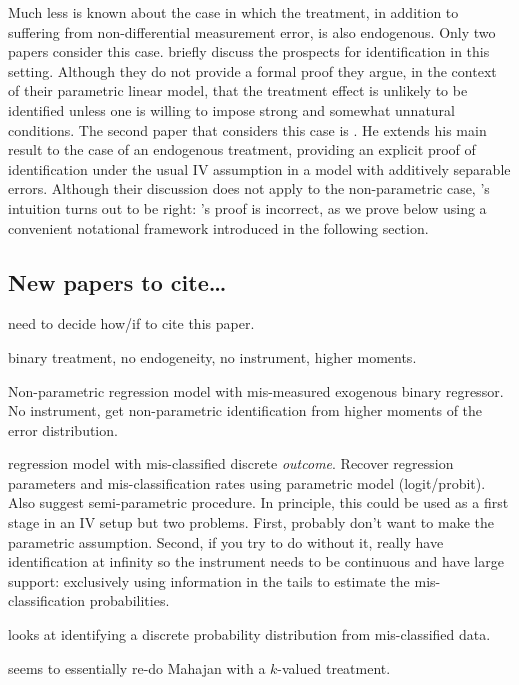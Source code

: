 Much less is known about the case in which the treatment, in addition to suffering from non-differential measurement error, is also endogenous.
Only two papers consider this case.
\cite{FL} briefly discuss the prospects for identification in this setting.
Although they do not provide a formal proof they argue, in the context of their parametric linear model, that the treatment effect is unlikely to be identified unless one is willing to impose strong and somewhat unnatural conditions. 
The second paper that considers this case is \cite{Mahajan}.
He extends his main result to the case of an endogenous treatment, providing an explicit proof of identification under the usual IV assumption in a model with additively separable errors.
Although their discussion does not apply to the non-parametric case, \citeauthor{FL}'s intuition turns out to be right: \citeauthor{Mahajan}'s proof is incorrect, as we prove below using a convenient notational framework introduced in the following section.

\subsection{New papers to cite\dots}

\cite{Card} need to decide how/if to cite this paper.




\cite{ChenHuLewbel} binary treatment, no endogeneity, no instrument, higher moments.

\cite{ChenHuLewbel2} Non-parametric regression model with mis-measured exogenous binary regressor. No instrument, get non-parametric identification from higher moments of the error distribution.


\cite{Hausman} regression model with mis-classified discrete \emph{outcome}. Recover regression parameters and mis-classification rates using parametric model (logit/probit). Also suggest semi-parametric procedure.
In principle, this could be used as a first stage in an IV setup but two problems.
First, probably don't want to make the parametric assumption.
Second, if you try to do without it, really have identification at infinity so the instrument needs to be continuous and have large support: exclusively using information in the tails to estimate the mis-classification probabilities.

\cite{molinari} looks at identifying a discrete probability distribution from mis-classified data.

\cite{hu2008} seems to essentially re-do Mahajan with a $k$-valued treatment.

